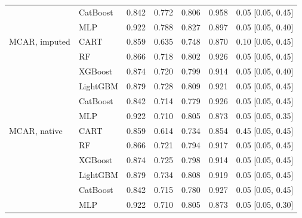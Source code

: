 \begin{table}[p]
\begin{tabular}{@{}llrrrrl@{}}
 & CatBoost & 0.842 & 0.772 & 0.806 & 0.958 & 0.05 [0.05, 0.45] \\
 & MLP & 0.922 & 0.788 & 0.827 & 0.897 & 0.05 [0.05, 0.40] \\
\midrule
MCAR, imputed & CART & 0.859 & 0.635 & 0.748 & 0.870 & 0.10 [0.05, 0.45] \\
 & RF & 0.866 & 0.718 & 0.802 & 0.926 & 0.05 [0.05, 0.45] \\
 & XGBoost & 0.874 & 0.720 & 0.799 & 0.914 & 0.05 [0.05, 0.40] \\
 & LightGBM & 0.879 & 0.728 & 0.809 & 0.921 & 0.05 [0.05, 0.45] \\
 & CatBoost & 0.842 & 0.714 & 0.779 & 0.926 & 0.05 [0.05, 0.45] \\
 & MLP & 0.922 & 0.710 & 0.805 & 0.873 & 0.05 [0.05, 0.35] \\
\midrule
MCAR, native & CART & 0.859 & 0.614 & 0.734 & 0.854 & 0.45 [0.05, 0.45] \\
 & RF & 0.866 & 0.721 & 0.794 & 0.917 & 0.05 [0.05, 0.45] \\
 & XGBoost & 0.874 & 0.725 & 0.798 & 0.914 & 0.05 [0.05, 0.45] \\
 & LightGBM & 0.879 & 0.734 & 0.808 & 0.919 & 0.05 [0.05, 0.45] \\
 & CatBoost & 0.842 & 0.715 & 0.780 & 0.927 & 0.05 [0.05, 0.45] \\
 & MLP & 0.922 & 0.710 & 0.805 & 0.873 & 0.05 [0.05, 0.30] \\
\bottomrule
\end{tabular}
\end{table}

